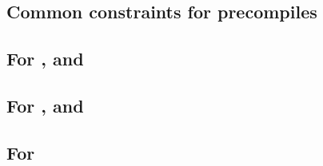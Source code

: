 \subsection{Common constraints for precompiles}                            \label{oob: precompiles: common precompiles: generalities}           \newpage
\subsection{For \oobInstEcrecover{}, \oobInstEcadd{} and \oobInstEcmul{}}  \label{oob: precompiles: common precompiles: one row precompiles}             \newpage
\subsection{For \oobInstShaTwo{}, \oobInstRipemd{} and \oobInstIdentity{}} \label{oob: precompiles: common precompiles: two row precompiles}             \newpage
\subsection{For \oobInstEcpairing{}}                                       \label{oob: precompiles: common precompiles: three row precompiles}           \newpage
